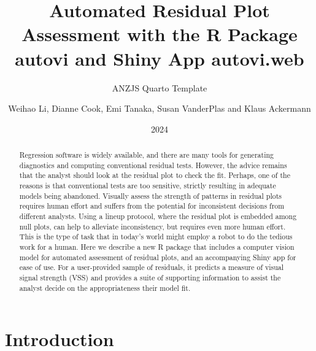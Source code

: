 \documentclass[
doublespace,
  times]{anzsauth}
\title{Automated Residual Plot Assessment with the R Package autovi and
Shiny App autovi.web}
\subtitle{ANZJS Quarto Template}
\author{
Weihao Li\addressnum{1},
Dianne Cook\addressnum{1},
Emi Tanaka\addressnum{2},
Susan VanderPlas\addressnum{3} and
Klaus Ackermann
\addressnum{1}
}
\affiliation{
Monash University,
The Australian National University and
University of Nebraska
}
\date{2024}
\begin{document}
\begin{abstract}
Regression software is widely available, and there are many tools for
generating diagnostics and computing conventional residual tests.
However, the advice remains that the analyst should look at the residual
plot to check the fit. Perhaps, one of the reasons is that conventional
tests are too sensitive, strictly resulting in adequate models being
abandoned. Visually assess the strength of patterns in residual plots
requires human effort and suffers from the potential for inconsistent
decisions from different analysts. Using a lineup protocol, where the
residual plot is embedded among null plots, can help to alleviate
inconsistency, but requires even more human effort. This is the type of
task that in today's world might employ a robot to do the tedious work
for a human. Here we describe a new R package that includes a computer
vision model for automated assessment of residual plots, and an
accompanying Shiny app for ease of use. For a user-provided sample of
residuals, it predicts a measure of visual signal strength (VSS) and
provides a suite of supporting information to assist the analyst decide
on the appropriateness their model fit.
\end{abstract}

          

\maketitle


\section{Introduction}\label{sec-autovi-introduction}
\end{document}
